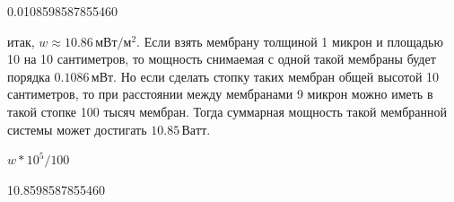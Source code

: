 \documentclass[11pt]{article}
\begin{document}
%
0.0108598587855460
        
    итак, \(w \approx 10.86\,мВт/м^2\). Если взять мембрану толщиной 1
микрон и площадью 10 на 10 сантиметров, то мощность снимаемая с одной
такой мембраны будет порядка \(0.1086\,мВт\). Но если сделать стопку
таких мембран общей высотой 10 сантиметров, то при расстоянии между
мембранами 9 микрон можно иметь в такой стопке 100 тысяч мембран. Тогда
суммарная мощность такой мембранной системы может достигать
\(10.85\,Ватт\).

$w*10^{5}/100$


10.8598587855460
        
\end{document}
